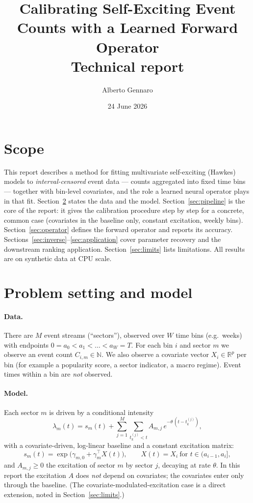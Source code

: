 \documentclass[11pt]{article}
\title{\bfseries Calibrating Self-Exciting Event Counts with a Learned Forward
Operator\\[3pt]\large Technical report}
\author{Alberto Gennaro}
\date{24 June 2026}
\begin{document}
\maketitle

\section{Scope}

This report describes a method for fitting multivariate self-exciting (Hawkes) models
to \emph{interval-censored} event data --- counts aggregated into fixed time bins ---
together with bin-level covariates, and the role a learned neural operator plays in
that fit. Section~\ref{sec:problem} states the data and the model. Section~\ref{sec:pipeline}
is the core of the report: it gives the calibration procedure step by step for a
concrete, common case (covariates in the baseline only, constant excitation, weekly
bins). Section~\ref{sec:operator} defines the forward operator and reports its accuracy.
Sections~\ref{sec:inverse}--\ref{sec:application} cover parameter recovery and the
downstream ranking application. Section~\ref{sec:limits} lists limitations.
All results are on synthetic data at CPU scale.

\section{Problem setting and model}
\label{sec:problem}

\paragraph{Data.} There are $M$ event streams (``sectors''), observed over $W$ time bins
(e.g.\ weeks) with endpoints $0=a_0<a_1<\dots<a_W=T$. For each bin $i$ and sector $m$
we observe an event count $C_{i,m}\in\mathbb{N}$. We also observe a covariate vector
$X_i\in\mathbb{R}^p$ per bin (for example a popularity score, a sector indicator, a
macro regime). Event times within a bin are \emph{not} observed.

\paragraph{Model.} Each sector $m$ is driven by a conditional intensity
\begin{equation}
\lambda_m(t) = s_m(t) + \sum_{j=1}^{M} \sum_{t_k^{(j)} < t} A_{m,j}\, e^{-\theta\,(t-t_k^{(j)})},
\label{eq:hawkes}
\end{equation}
with a covariate-driven, log-linear baseline and a constant excitation matrix:
\begin{equation}
s_m(t) = \exp\!\big(\gamma_{m,0} + \gamma_m^\top X(t)\big),
\qquad X(t)=X_i \ \text{for } t\in(a_{i-1},a_i],
\label{eq:baseline}
\end{equation}
and $A_{m,j}\ge 0$ the excitation of sector $m$ by sector $j$, decaying at rate
$\theta$. In this report the excitation $A$ does \emph{not} depend on covariates; the
covariates enter only through the baseline. (The covariate-modulated-excitation case is
a direct extension, noted in Section~\ref{sec:limits}.)
\end{document}
